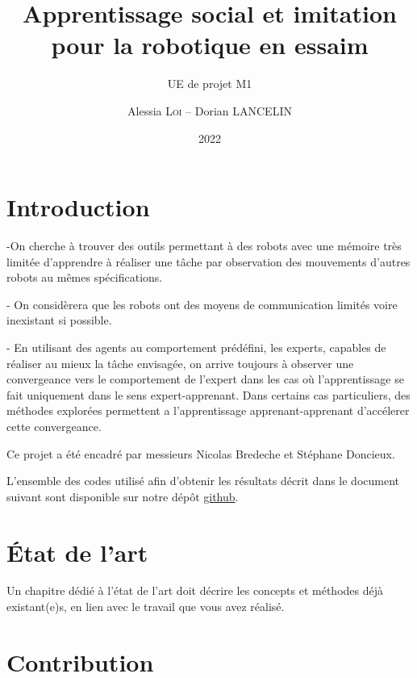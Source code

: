 \documentclass[a4paper, 12pt]{report}
\institute{Sorbonne Université}
\title{Apprentissage social et imitation pour la robotique en essaim}
\subtitle{UE de projet M1}
\author{Alessia \textsc{Loi} -- Dorian \textsc{LANCELIN}}
\date{2022}
\begin{document}
    \maketitle
    \romantableofcontents

    \chapter{Introduction}

    -On cherche à trouver des outils permettant à des robots avec une mémoire très limitée d'apprendre à réaliser une tâche par observation des mouvements d'autres robots au mêmes spécifications.
    
    - On considèrera que les robots ont des moyens de communication limités voire inexistant si possible.
    
    - En utilisant des agents au comportement prédéfini, les experts, capables de réaliser au mieux la tâche envisagée, on arrive toujours à observer une convergeance vers le comportement de l'expert dans les cas où l'apprentissage se fait uniquement dans le sens expert-apprenant.
    Dans certains cas particuliers, des méthodes explorées permettent a l'apprentissage apprenant-apprenant d'accélerer cette convergeance. 
    
    Ce projet a été encadré par messieurs Nicolas Bredeche et Stéphane Doncieux.  
    
    L'ensemble des codes utilisé afin d'obtenir les résultats décrit dans le document suivant sont disponible sur notre dépôt \href{https://github.com/aerrynn/M1_Projet_ASIRE}{github}. 

    \chapter{État de l'art}
    Un chapitre dédié à l'état de l'art doit décrire les concepts et méthodes déjà existant(e)s, en lien avec le travail que vous avez réalisé.
    
    \chapter{Contribution}
   
\end{document}
